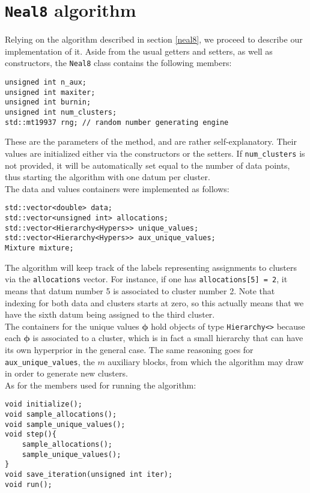 \section{\texttt{Neal8} algorithm}
Relying on the algorithm described in section \ref{neal8}, we proceed to describe our implementation of it.
Aside from the usual getters and setters, as well as constructors, the \verb|Neal8| class contains the following members:
\begin{verbatim}
unsigned int n_aux;
unsigned int maxiter;
unsigned int burnin;
unsigned int num_clusters;
std::mt19937 rng; // random number generating engine
\end{verbatim}
These are the parameters of the method, and are rather self-explanatory.
Their values are initialized either via the constructors or the setters.
If \verb|num_clusters| is not provided, it will be automatically set equal to the number of data points, thus starting the algorithm with one datum per cluster. \\
The data and values containers were implemented as follows:
\begin{verbatim}
std::vector<double> data;
std::vector<unsigned int> allocations;
std::vector<Hierarchy<Hypers>> unique_values;
std::vector<Hierarchy<Hypers>> aux_unique_values;
Mixture mixture;
\end{verbatim}
The algorithm will keep track of the labels representing assignments to clusters via the \verb|allocations| vector.
For instance, if one has \verb|allocations[5] = 2|, it means that datum number 5 is associated to cluster number 2.
Note that indexing for both data and clusters starts at zero, so this actually means that we have the sixth datum being assigned to the third cluster. \\
The containers for the unique values $\boldsymbol\phi$ hold objects of type \verb|Hierarchy<>| because each $\boldsymbol\phi$ is associated to a cluster, which is in fact a small hierarchy that can have its own hyperprior in the general case.
The same reasoning goes for \verb|aux_unique_values|, the $m$ auxiliary blocks, from which the algorithm may draw in order to generate new clusters. \\
As for the members used for running the algorithm:
\begin{verbatim}
void initialize();
void sample_allocations();
void sample_unique_values();
void step(){
    sample_allocations();
    sample_unique_values();
}
void save_iteration(unsigned int iter);
void run();
\end{verbatim}

